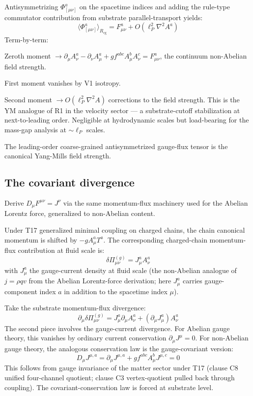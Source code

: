 \documentclass[11pt,a4paper]{article}
\begin{document}
Antisymmetrizing $\Phi_{[\mu\nu]}^a$ on the spacetime indices and adding the rule-type commutator contribution from substrate parallel-transport yields:
\[
\langle \Phi_{[\mu\nu]}^a\rangle_{R_\mathrm{cg}} = F_{\mu\nu}^a + O(\ell_P^{2} \nabla^{2} A^a)
\]
Term-by-term:

Zeroth moment $\to \partial_\mu A_\nu^a - \partial_\nu A_\mu^a + g f^{abc} A_\mu^b A_\nu^c = F_{\mu\nu}^a$, the continuum non-Abelian field strength.

First moment vanishes by V1 isotropy.

Second moment $\to O(\ell_P^{2} \nabla^{2}A)$ corrections to the field strength. This is the YM analogue of R1 in the velocity sector --- a substrate-cutoff stabilization at next-to-leading order. Negligible at hydrodynamic scales but load-bearing for the mass-gap analysis at $\sim \ell_P$ scales.

The leading-order coarse-grained antisymmetrized gauge-flux tensor is the canonical Yang-Mills field strength.

\subsection{The covariant divergence}

Derive $D_\mu F^{\mu\nu} = J^\nu$ via the same momentum-flux machinery used for the Abelian Lorentz force, generalized to non-Abelian content.

Under T17 generalized minimal coupling on charged chains, the chain canonical momentum is shifted by $-g A_\mu^a T^a$. The corresponding charged-chain momentum-flux contribution at fluid scale is:
\[
\delta \Pi_{\mu\nu}^{(g)} = J_\mu^a A_\nu^a
\]
with $J_\mu^a$ the gauge-current density at fluid scale (the non-Abelian analogue of $j = \rho q v$ from the Abelian Lorentz-force derivation; here $J_\mu^a$ carries gauge-component index $a$ in addition to the spacetime index $\mu$).

Take the substrate momentum-flux divergence:
\[
\partial_\mu \delta \Pi_{\mu\nu}^{(g)} = J_\mu^a \partial_\mu A_\nu^a + (\partial_\mu J_\mu^a) A_\nu^a
\]
The second piece involves the gauge-current divergence. For Abelian gauge theory, this vanishes by ordinary current conservation $\partial_\mu J^\mu = 0$. For non-Abelian gauge theory, the analogous conservation law is the gauge-covariant version:
\[
D_\mu J^{\mu,a} = \partial_\mu J^{\mu,a} + g f^{abc} A_\mu^b J^{\mu,c} = 0
\]
This follows from gauge invariance of the matter sector under T17 (clause C8 unified four-channel quotient; clause C3 vertex-quotient pulled back through coupling). The covariant-conservation law is forced at substrate level.
\end{document}
